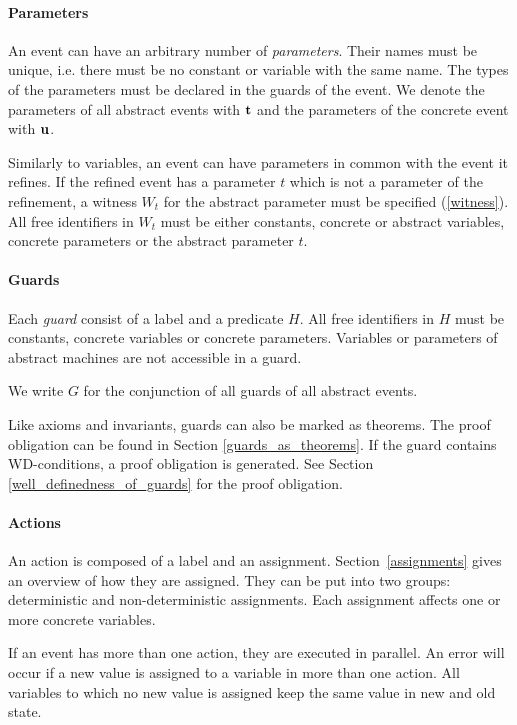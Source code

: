 \paragraph{Parameters}
\label{parameters}
An event can have an arbitrary number of \emph{parameters}. Their names must be unique, i.e. there must be no constant or variable with the same name.
The types of the parameters must be declared in the guards of the event.
We denote the parameters of all abstract events with $\mathbf{t}$ and the
parameters of the concrete event with $\mathbf{u}$.

Similarly to variables, an event can have parameters in common with the event it refines.
If the refined event has a parameter $t$ which is not a parameter of the refinement, 
 a witness $W_t$ for
 the abstract parameter must be specified (\ref{witness}).
All free identifiers in $W_t$ must be either constants, concrete or abstract variables, concrete
 parameters or the abstract parameter $t$.

\paragraph{Guards}
\label{guards}
Each \emph{guard} consist of a label and a predicate $H$.
All free identifiers in $H$ must be constants, concrete variables or concrete parameters.
Variables or parameters of abstract machines are not accessible in a guard.

We write $G$ for the conjunction of all guards of all abstract events.

Like axioms and invariants, guards can also be marked as theorems. 
The proof obligation can be found in Section \ref{guards_as_theorems}.
If the guard contains WD-conditions, a proof obligation is generated.
See Section \ref{well_definedness_of_guards} for the proof obligation.

\paragraph{Actions}
\label{actions}
An action is composed of a label and an assignment.
Section~\ref{assignments} gives an overview of how they are assigned.
They can be put into two groups: deterministic and non-deterministic assignments.
Each assignment affects one or more concrete variables.

If an event has more than one action, they are executed in parallel. 
An error will occur if a new value is assigned to a variable in more than one action.
All variables to which no new value is assigned keep the same value in new and old state.

